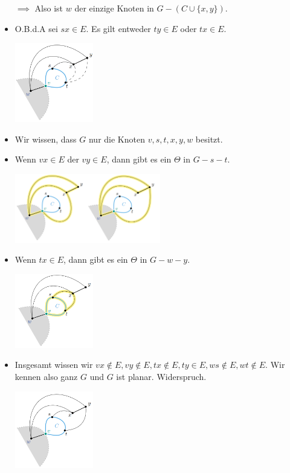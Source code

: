 \begin{itemize}
	$\implies$ Also ist $w$ der einzige Knoten in $G-(C\cup\{x,y\})$.
	\item O.B.d.A sei $sx\in E$. Es gilt entweder $ty\in E$ oder $tx\in E$.
		\begin{center}
		\includegraphics[width=0.27\textwidth]{images/wagner-13.png}
	\end{center}
	\item Wir wissen, dass $G$ nur die Knoten $v, s, t, x, y, w$ besitzt.
	\item Wenn $vx\in E$ der $vy\in E$, dann gibt es ein $\Theta$ in $G-s-t$.
	\begin{center}
		\includegraphics[width=0.5\textwidth]{images/wagner-14.png}
	\end{center}
	\item Wenn $tx\in E$, dann gibt es ein $\Theta$ in $G-w-y$.
	\begin{center}
		\includegraphics[width=0.27\textwidth]{images/wagner-15.png}
	\end{center}
	\pagebreak

	\item Insgesamt wissen wir $vx\notin E, vy\notin E, tx\notin E, ty\in E, ws\notin E, wt\notin E$. Wir kennen also ganz $G$ und $G$ ist planar. Widerspruch.
	\begin{center}
		\includegraphics[width=0.27\textwidth]{images/wagner-16.png}
	\end{center}
\end{itemize}

